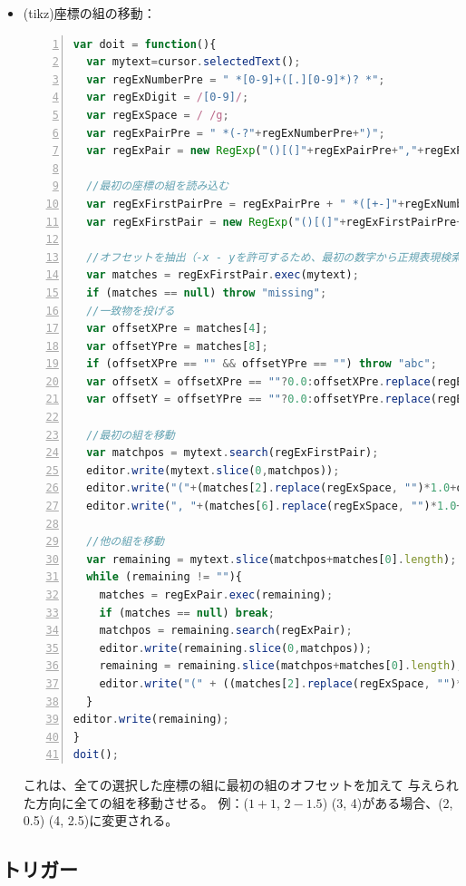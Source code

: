 \begin{itemize}
  これは\%と=の間のもの全てを評価して、=の後ろに結果を書き込む。
  texファイルに\%5+3=を書くと計算機のように使用出来る。
\item
  (tikz)座標の組の移動：
\begin{lstlisting}[frame=single,language=JavaScript,breaklines=true,numbers=left]
%SCRIPT
var doit = function(){
  var mytext=cursor.selectedText();
  var regExNumberPre = " *[0-9]+([.][0-9]*)? *";
  var regExDigit = /[0-9]/;
  var regExSpace = / /g;
  var regExPairPre = " *(-?"+regExNumberPre+")";
  var regExPair = new RegExp("()[(]"+regExPairPre+","+regExPairPre+"[)]"); ;

  //最初の座標の組を読み込む
  var regExFirstPairPre = regExPairPre + " *([+-]"+regExNumberPre+")?";
  var regExFirstPair = new RegExp("()[(]"+regExFirstPairPre+","+regExFirstPairPre+"[)]");

  //オフセットを抽出（-x - yを許可するため、最初の数字から正規表現検索を開始）
  var matches = regExFirstPair.exec(mytext);
  if (matches == null) throw "missing";
  //一致物を投げる
  var offsetXPre = matches[4];
  var offsetYPre = matches[8];
  if (offsetXPre == "" && offsetYPre == "") throw "abc";
  var offsetX = offsetXPre == ""?0.0:offsetXPre.replace(regExSpace, "")*1.0;
  var offsetY = offsetYPre == ""?0.0:offsetYPre.replace(regExSpace, "")*1.0;

  //最初の組を移動
  var matchpos = mytext.search(regExFirstPair);
  editor.write(mytext.slice(0,matchpos));
  editor.write("("+(matches[2].replace(regExSpace, "")*1.0+offsetX));
  editor.write(", "+(matches[6].replace(regExSpace, "")*1.0+offsetY)+")");

  //他の組を移動
  var remaining = mytext.slice(matchpos+matches[0].length);
  while (remaining != ""){
    matches = regExPair.exec(remaining);
    if (matches == null) break;
    matchpos = remaining.search(regExPair);
    editor.write(remaining.slice(0,matchpos));
    remaining = remaining.slice(matchpos+matches[0].length);
    editor.write("(" + ((matches[2].replace(regExSpace, "")*1.0)+offsetX) + ", "+ ((matches[4].replace(regExSpace, "")*1.0)+offsetY) + ")");
  }
editor.write(remaining);
}
doit();
\end{lstlisting}

  これは、全ての選択した座標の組に最初の組のオフセットを加えて
  与えられた方向に全ての組を移動させる。
  例：($1 + 1$, $2 - 1.5$) (3, 4)がある場合、(2, 0.5) (4, 2.5)に変更される。
\end{itemize}

\subsection{トリガー}\label{sec:triggers}


